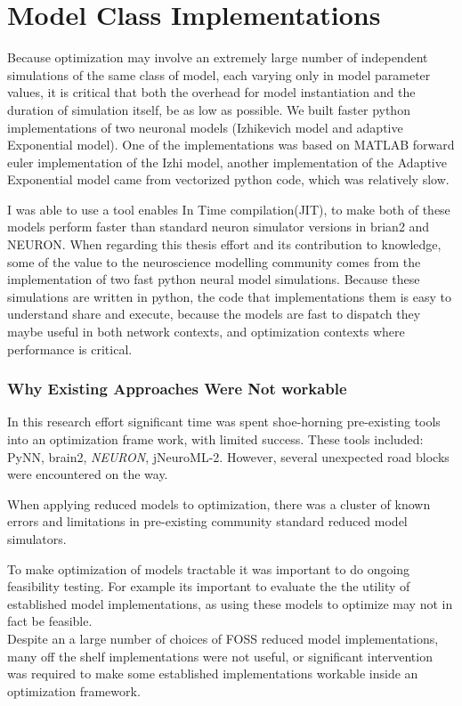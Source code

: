 \section{Model Class Implementations}
Because optimization may involve an extremely large number of independent simulations of the same class of model, each varying only in model parameter values, it is critical that both the overhead for model instantiation and the duration of simulation itself, be as low as possible. We built faster python implementations of two neuronal models (Izhikevich model and adaptive Exponential model). One of the implementations was based on MATLAB forward euler implementation of the Izhi model, another implementation of the Adaptive Exponential model came from vectorized python code, which was relatively slow.

I was able to use a tool \cite{numba} enables In Time compilation(JIT), to make both of these models perform faster than standard neuron simulator versions in brian2 and NEURON.
 When regarding this thesis effort and its contribution to knowledge, some of the value to the neuroscience modelling community comes from the implementation of two fast python neural model simulations. Because these simulations are written in python, the code that implementations them is easy to understand share and execute, because the models are fast to dispatch they maybe useful in both network contexts, and optimization contexts where performance is critical. 
 


\subsubsection{Why Existing Approaches Were Not workable}
In this research effort significant time was spent shoe-horning pre-existing tools into an optimization frame work, with limited success. These tools included:  PyNN, brain2, \emph{NEURON}, jNeuroML-2. However, several unexpected road blocks were encountered on the way.
 
When applying reduced models to optimization, there was a cluster of known errors and limitations in pre-existing community standard reduced model simulators. 

To make optimization of models tractable it was important to do ongoing feasibility testing. For example its important to evaluate the the utility of established model implementations, as using these models to optimize may not in fact be feasible.\\ 
Despite an a large number of choices of FOSS reduced model implementations, many off the shelf implementations were not useful, or significant intervention was required to make some established implementations workable inside an optimization framework. \\
 
